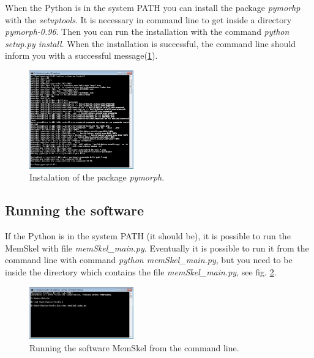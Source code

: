 When the Python is in the system PATH you can install the package \textit{pymorhp} with the \textit{setuptools}. It is necessary in command line to get inside a directory \textit{pymorph-0.96}. Then you can run the installation with the command \textit{python setup.py install}. When the installation is successful, the command line should inform you with a successful message(\ref{fig:cmd_pymorph}).

\begin{figure}[htb]
	\centering
	\includegraphics[width=0.4\textwidth]{cmd_pymorph.png}
	\caption{Instalation of the package \textit{pymorph}.}
	\label{fig:cmd_pymorph}
\end{figure}

\subsection{Running the software}
If the Python is in the system PATH (it should be), it is possible to run the MemSkel with file \textit{memSkel\_main.py}. Eventually it is possible to run it from the command line with command  \textit{python memSkel\_main.py}, but you need to be inside the directory which contains the file \textit{memSkel\_main.py}, see fig. \ref{fig:run}.

\begin{figure}[htb]
	\centering
	\includegraphics[width=0.4\textwidth]{run.png}
	\caption{Running the software MemSkel from the command line.}
	\label{fig:run}
\end{figure}